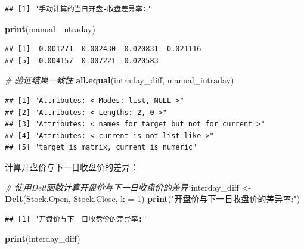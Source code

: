 \documentclass[]{ctexbook}
\newenvironment{Shaded}{\begin{snugshade}}{\end{snugshade}}
\newcommand{\AttributeTok}[1]{\textcolor[rgb]{0.13,0.29,0.53}{#1}}
\newcommand{\CommentTok}[1]{\textcolor[rgb]{0.56,0.35,0.01}{\textit{#1}}}
\newcommand{\DecValTok}[1]{\textcolor[rgb]{0.00,0.00,0.81}{#1}}
\newcommand{\FunctionTok}[1]{\textcolor[rgb]{0.13,0.29,0.53}{\textbf{#1}}}
\newcommand{\NormalTok}[1]{#1}
\newcommand{\OtherTok}[1]{\textcolor[rgb]{0.56,0.35,0.01}{#1}}
\newcommand{\StringTok}[1]{\textcolor[rgb]{0.31,0.60,0.02}{#1}}
\begin{document}
\begin{verbatim}
## [1] "手动计算的当日开盘-收盘差异率:"
\end{verbatim}

\begin{Shaded}
\begin{Highlighting}[]
\FunctionTok{print}\NormalTok{(manual\_intraday)}
\end{Highlighting}
\end{Shaded}

\begin{verbatim}
## [1]  0.001271  0.002430  0.020831 -0.021116
## [5] -0.004157  0.007221 -0.020583
\end{verbatim}

\begin{Shaded}
\begin{Highlighting}[]
\CommentTok{\# 验证结果一致性}
\FunctionTok{all.equal}\NormalTok{(intraday\_diff, manual\_intraday)}
\end{Highlighting}
\end{Shaded}

\begin{verbatim}
## [1] "Attributes: < Modes: list, NULL >"                   
## [2] "Attributes: < Lengths: 2, 0 >"                       
## [3] "Attributes: < names for target but not for current >"
## [4] "Attributes: < current is not list-like >"            
## [5] "target is matrix, current is numeric"
\end{verbatim}

计算开盘价与下一日收盘价的差异：

\begin{Shaded}
\begin{Highlighting}[]
\CommentTok{\# 使用Delt函数计算开盘价与下一日收盘价的差异}
\NormalTok{interday\_diff }\OtherTok{\textless{}{-}} \FunctionTok{Delt}\NormalTok{(Stock.Open, Stock.Close, }\AttributeTok{k =} \DecValTok{1}\NormalTok{)}
\FunctionTok{print}\NormalTok{(}\StringTok{"开盘价与下一日收盘价的差异率:"}\NormalTok{)}
\end{Highlighting}
\end{Shaded}

\begin{verbatim}
## [1] "开盘价与下一日收盘价的差异率:"
\end{verbatim}

\begin{Shaded}
\begin{Highlighting}[]
\FunctionTok{print}\NormalTok{(interday\_diff)}
\end{Highlighting}
\end{Shaded}
\end{document}
